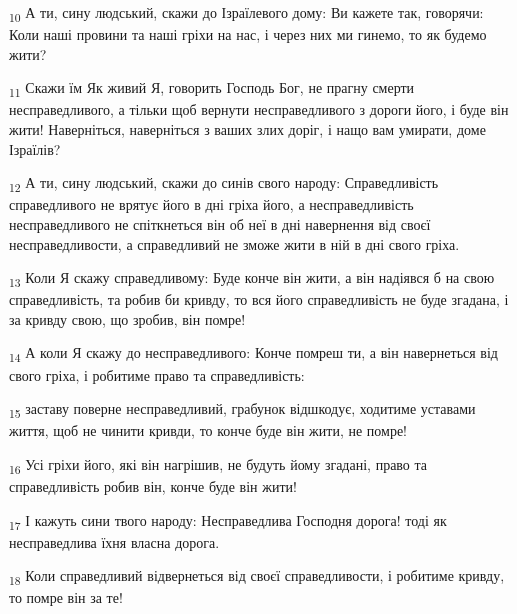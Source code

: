 \begin{tcolorbox}
\textsubscript{10} А ти, сину людський, скажи до Ізраїлевого дому: Ви кажете так, говорячи: Коли наші провини та наші гріхи на нас, і через них ми гинемо, то як будемо жити?
\end{tcolorbox}
\begin{tcolorbox}
\textsubscript{11} Скажи їм Як живий Я, говорить Господь Бог, не прагну смерти несправедливого, а тільки щоб вернути несправедливого з дороги його, і буде він жити! Наверніться, наверніться з ваших злих доріг, і нащо вам умирати, доме Ізраїлів?
\end{tcolorbox}
\begin{tcolorbox}
\textsubscript{12} А ти, сину людський, скажи до синів свого народу: Справедливість справедливого не врятує його в дні гріха його, а несправедливість несправедливого не спіткнеться він об неї в дні навернення від своєї несправедливости, а справедливий не зможе жити в ній в дні свого гріха.
\end{tcolorbox}
\begin{tcolorbox}
\textsubscript{13} Коли Я скажу справедливому: Буде конче він жити, а він надіявся б на свою справедливість, та робив би кривду, то вся його справедливість не буде згадана, і за кривду свою, що зробив, він помре!
\end{tcolorbox}
\begin{tcolorbox}
\textsubscript{14} А коли Я скажу до несправедливого: Конче помреш ти, а він навернеться від свого гріха, і робитиме право та справедливість:
\end{tcolorbox}
\begin{tcolorbox}
\textsubscript{15} заставу поверне несправедливий, грабунок відшкодує, ходитиме уставами життя, щоб не чинити кривди, то конче буде він жити, не помре!
\end{tcolorbox}
\begin{tcolorbox}
\textsubscript{16} Усі гріхи його, які він нагрішив, не будуть йому згадані, право та справедливість робив він, конче буде він жити!
\end{tcolorbox}
\begin{tcolorbox}
\textsubscript{17} І кажуть сини твого народу: Несправедлива Господня дорога! тоді як несправедлива їхня власна дорога.
\end{tcolorbox}
\begin{tcolorbox}
\textsubscript{18} Коли справедливий відвернеться від своєї справедливости, і робитиме кривду, то помре він за те!
\end{tcolorbox}
